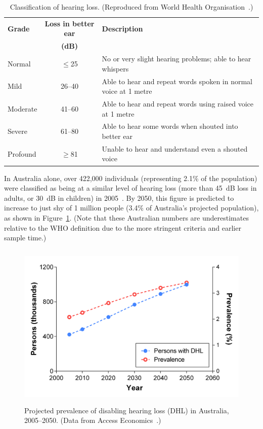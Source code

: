 \begin{table}[p]
	\centering
	\sffamily
	\small
	
	\caption[Classification of hearing loss]{Classification of hearing loss.
	(Reproduced from World Health Organisation~\cite{mathers2000}.)}
	\label{table:hearing_loss_classification}
	
	\begin{tabular}{l c l}
		\toprule
		\textbf{Grade}	& \textbf{Loss in better ear} 	& \textbf{Description} \\
						& \textbf{(dB)} 				& \\
		\midrule
		
		Normal			& $ \leq $25 	& No or very slight hearing problems; 
											able to hear whispers \\
		Mild			& 26--40		& Able to hear and repeat words spoken 
											in normal voice at 1 metre \\
		Moderate		& 41--60		& Able to hear and repeat words using 
											raised voice at 1 metre \\
		Severe			& 61--80		& Able to hear some words when shouted 
											into better ear \\
		Profound		& $ \geq $81	& Unable to hear and understand even a 
											shouted voice \\
		\bottomrule
	\end{tabular}
\end{table}

In Australia alone, over 422,000 individuals (representing 2.1\% of the
population) were classified as being at a similar level of hearing loss (more
than 45~dB loss in adults, or 30~dB in children) in 2005~\cite{economics2006}.
By 2050, this figure is predicted to increase to just shy of 1 million people
(3.4\% of Australia's projected population), as shown in
Figure~\ref{fig:HL_prevalence}. (Note that these Australian numbers are
underestimates relative to the WHO definition due to the more stringent
criteria and earlier sample time.)

\begin{figure}[p]
	\centering
	\includegraphics[height=8cm]{Introduction/hl_prevalence}
	\caption[Projected prevalence of disabling hearing loss in Australia]{Projected
	prevalence of disabling hearing loss (DHL) in Australia, 2005--2050. (Data from
	Access Economics~\cite{economics2006}.)}
	\label{fig:HL_prevalence}
\end{figure} 

